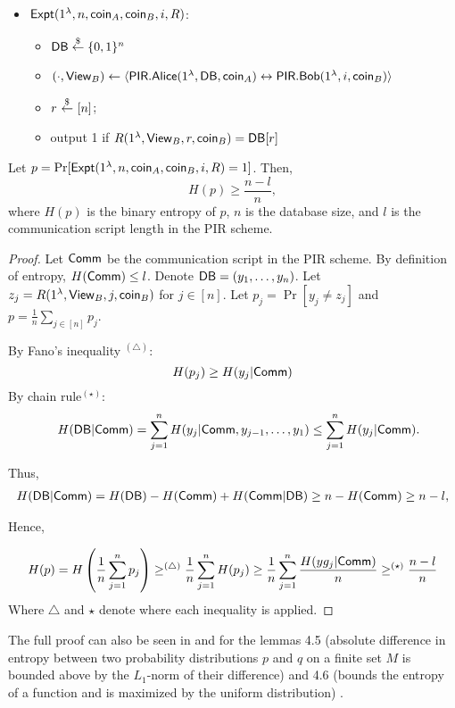 \begin{itemize}
\item
${\sf Expt}(1^\lambda, n, {\sf coin}_A, {\sf coin}_B, i, R)$:
\begin{itemize}
\item ${\sf DB} \stackrel{\$}{\leftarrow}\{0,1\}^n$ 
    \item $(\cdot,{\sf View}_B)\leftarrow \langle{\sf PIR}.{\sf Alice}(1^{\lambda}, {\sf DB}, {\sf coin}_A) \leftrightarrow {\sf PIR}.{\sf Bob}(1^{\lambda}, i, {\sf coin}_B)\rangle$
    \item $r~{\overset{\$}{\leftarrow}}~ [n]$;
    \item output 1 if $R(1^\lambda, {\sf View}_B, r, {\sf coin}_B) = {\sf DB}[r]$
\end{itemize}
\end{itemize}

\begin{claim}
    Let 
    $p = \Pr[{\sf Expt}(1^\lambda, n, {\sf coin}_A, {\sf coin}_B, i, R)=1]$. Then, 
    $$H(p) \geq \frac{n-l}{n},$$ where $H(p)$ is the binary entropy of $p$, $n$ is the database size, and $l$ is the communication script length in the PIR scheme.
\end{claim}

\begin{proof}
Let ${\sf Comm}$ be the communication script in the PIR scheme.
By definition of entropy, $H({\sf Comm}) \leq l$.
Denote ${\sf DB}=(y_1,\dots,y_n)$. Let $z_j = R (1^\lambda, {\sf View}_{B}, j, {\sf coin}_B)$ for $j \in [n]$.
Let $p_j = \Pr[y_j\ne z_j]$ and $p = \frac{1}{n} \sum_{j \in [n]} p_j$.

\noindent By Fano's inequality $^{(\triangle)}$: $$H(p_j) \geq H(y_j | {\sf Comm})$$
By chain rule$^{(\star)}$: 
\[
\quad H({\sf DB} | {\sf Comm}) = \sum_{j=1}^{n} H(y_{j} | {\sf Comm}, y_{j-1}, \ldots, y_1) \leq \sum_{j=1}^{n} H(y_{j}| {\sf Comm}).
\]

Thus,
\begin{align*}
H({{\sf DB}}|{\sf Comm}) = H({{\sf DB}}) - H({\sf Comm}) + H({\sf Comm} |{{\sf DB}}) \geq n - H({\sf Comm})
\geq n - l,
\end{align*}

Hence,

$$H(p) = H\left( \frac{1}{n} \sum_{j=1}^{n} p_j \right) \geq^{(\triangle)}  \frac{1}{n} \sum_{j=1}^{n} H(p_j)\geq \frac{1}{n} \sum_{j=1}^{n}\frac{H(y g_j | {\sf Comm})}{n} \geq^{(\star)} \frac{n - l}{n}$$
Where $\triangle$ and $\star$ denote where each inequality is applied.
\end{proof}

The full proof can also be seen in \cite{DLN19}
and for the lemmas 4.5 (absolute difference in entropy between two probability distributions $p$ and $q$ on a finite set $M$ is bounded above by the $L_{1}\text{-norm}$ of their difference) and 4.6 (bounds the entropy of a function and is maximized by the uniform distribution) \cite{669255}.

